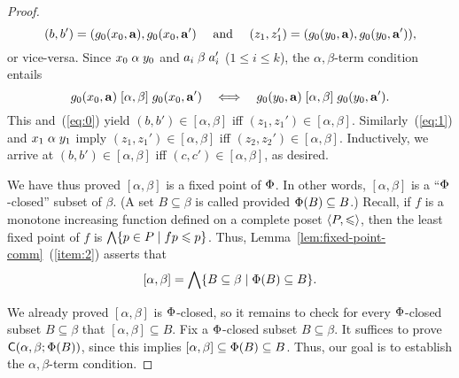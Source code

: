 \begin{proof}
    \[
    (b, b') = (g_0(x_0, \mathbf{a}), g_0(x_0, \mathbf{a}')
    \quad \text{ and } \quad 
    (z_1,z_1')= (g_0(y_0, \mathbf{a}), g_0(y_0, \mathbf{a}')),
    \]
    or vice-versa.  Since $x_0 \mathrel{\alpha} y_0$ and 
    $a_i \mathrel{\beta} a_i'$ ($1\leq i\leq k$), the $\alpha,\beta$-term condition
    entails
    \[
    g_0(x_0, \mathbf{a}) \mathrel{[\alpha, \beta]} g_0(x_0, \mathbf{a}')
    \quad \Longleftrightarrow \quad 
    g_0(y_0, \mathbf{a}) \mathrel{[\alpha, \beta]} g_0(y_0, \mathbf{a}').
    \]
    This and~(\ref{eq:0}) yield
    $(b,b')\in [\alpha, \beta]$ iff
    $(z_1,z_1')\in [\alpha, \beta]$.
    Similarly~(\ref{eq:1}) and $x_1 \mathrel{\alpha} y_1$ imply
    $(z_1,z_1')\in [\alpha, \beta]$ iff
    $(z_2,z_2')\in [\alpha, \beta]$.  Inductively, we arrive at 
    $(b,b')\in [\alpha, \beta]$ iff $(c,c')\in [\alpha, \beta]$, as desired.

    We have thus proved $[\alpha, \beta]$ is a fixed point of $\Phi$.
    In other words, 
    $[\alpha, \beta]$ is a ``$\Phi$-closed'' subset of $\beta$.
    (A set $B\subseteq \beta$ is called  provided
    $\Phi(B) \subseteq B$.)
    Recall, if $f$ is a monotone increasing function defined on a
    complete poset $\langle P, \leqslant\rangle$, then the least fixed point of $f$
    is $\bigwedge \{ p\in P \mid f p \leqslant p\}$. %
    Thus,
    Lemma~\ref{lem:fixed-point-comm}~(\ref{item:2}) asserts that
    \begin{equation}
      \label{eq:2}
            [\alpha, \beta] =\bigwedge \{ B \subseteq \beta \mid \Phi(B) \subseteq B\}.
    \end{equation}

    We already proved $[\alpha, \beta]$ is
    $\Phi$-closed, so it remains to check for every $\Phi$-closed subset
    $B\subseteq \beta$ that $[\alpha, \beta] \subseteq B$.
    Fix a $\Phi$-closed subset $B\subseteq \beta$. %
    It suffices to prove $\mathsf{C}(\alpha, \beta; \Phi(B))$, since this implies 
    $[\alpha, \beta] \subseteq \Phi(B) \subseteq B$.
    Thus, our goal is to establish the $\alpha, \beta$-term condition.


\end{proof}
